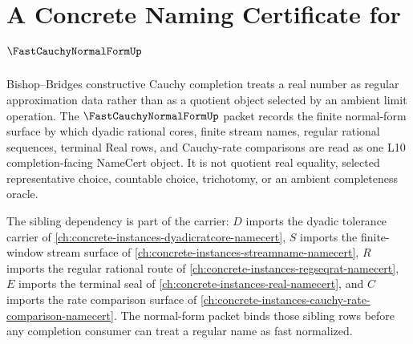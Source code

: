 \chapter{A Concrete Naming Certificate for $\FastCauchyNormalFormUp$}
\label{ch:concrete-instances-fast-cauchy-normal-form-namecert}

Bishop--Bridges constructive Cauchy completion treats a real number as regular approximation data rather than as a quotient object selected by an ambient limit operation. The $\FastCauchyNormalFormUp$ packet records the finite normal-form surface by which dyadic rational cores, finite stream names, regular rational sequences, terminal Real rows, and Cauchy-rate comparisons are read as one L10 completion-facing NameCert object. It is not quotient real equality, selected representative choice, countable choice, trichotomy, or an ambient completeness oracle.

The sibling dependency is part of the carrier: $D$ imports the dyadic tolerance carrier of \autoref{ch:concrete-instances-dyadicratcore-namecert}, $S$ imports the finite-window stream surface of \autoref{ch:concrete-instances-streamname-namecert}, $R$ imports the regular rational route of \autoref{ch:concrete-instances-regseqrat-namecert}, $E$ imports the terminal seal of \autoref{ch:concrete-instances-real-namecert}, and $C$ imports the rate comparison surface of \autoref{ch:concrete-instances-cauchy-rate-comparison-namecert}. The normal-form packet binds those sibling rows before any completion consumer can treat a regular name as fast normalized.

